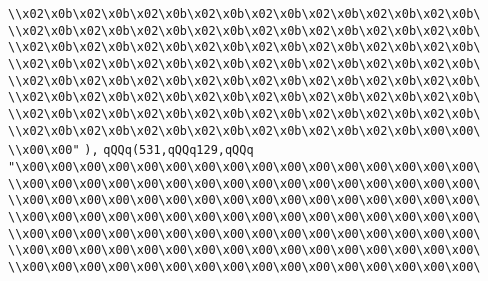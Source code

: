 \verb|\\x02\x0b\x02\x0b\x02\x0b\x02\x0b\x02\x0b\x02\x0b\x02\x0b\x02\x0b\|\newline
\verb|\\x02\x0b\x02\x0b\x02\x0b\x02\x0b\x02\x0b\x02\x0b\x02\x0b\x02\x0b\|\newline
\verb|\\x02\x0b\x02\x0b\x02\x0b\x02\x0b\x02\x0b\x02\x0b\x02\x0b\x02\x0b\|\newline
\verb|\\x02\x0b\x02\x0b\x02\x0b\x02\x0b\x02\x0b\x02\x0b\x02\x0b\x02\x0b\|\newline
\verb|\\x02\x0b\x02\x0b\x02\x0b\x02\x0b\x02\x0b\x02\x0b\x02\x0b\x02\x0b\|\newline
\verb|\\x02\x0b\x02\x0b\x02\x0b\x02\x0b\x02\x0b\x02\x0b\x02\x0b\x02\x0b\|\newline
\verb|\\x02\x0b\x02\x0b\x02\x0b\x02\x0b\x02\x0b\x02\x0b\x02\x0b\x02\x0b\|\newline
\verb|\\x02\x0b\x02\x0b\x02\x0b\x02\x0b\x02\x0b\x02\x0b\x02\x0b\x00\x00\|\newline
\verb|\\x00\x00"|\newline
\verb|),|\newline
\verb|qQQq(531,qQQq129,qQQq|\newline
\verb|"\x00\x00\x00\x00\x00\x00\x00\x00\x00\x00\x00\x00\x00\x00\x00\x00\|\newline
\verb|\\x00\x00\x00\x00\x00\x00\x00\x00\x00\x00\x00\x00\x00\x00\x00\x00\|\newline
\verb|\\x00\x00\x00\x00\x00\x00\x00\x00\x00\x00\x00\x00\x00\x00\x00\x00\|\newline
\verb|\\x00\x00\x00\x00\x00\x00\x00\x00\x00\x00\x00\x00\x00\x00\x00\x00\|\newline
\verb|\\x00\x00\x00\x00\x00\x00\x00\x00\x00\x00\x00\x00\x00\x00\x00\x00\|\newline
\verb|\\x00\x00\x00\x00\x00\x00\x00\x00\x00\x00\x00\x00\x00\x00\x00\x00\|\newline
\verb|\\x00\x00\x00\x00\x00\x00\x00\x00\x00\x00\x00\x00\x00\x00\x00\x00\|\newline

